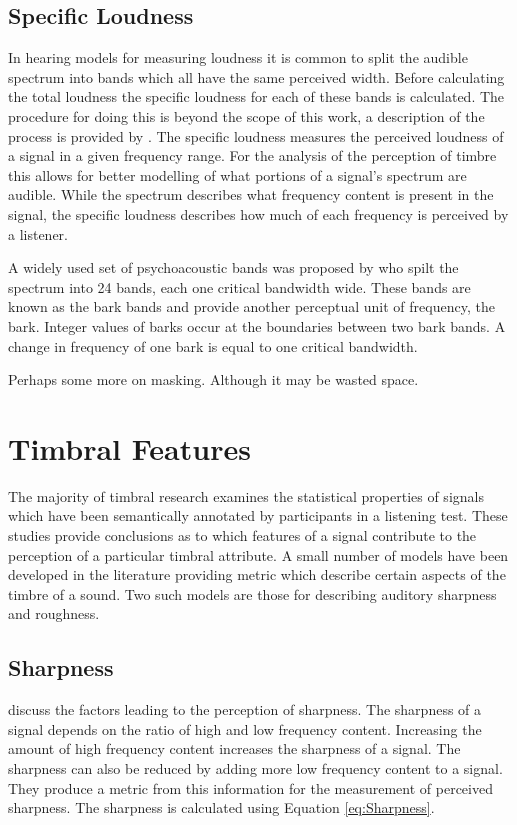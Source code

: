	\subsection{Specific Loudness}
	\label{sec:Timbre-PsychoacousticPrinciples-SpecificLoudness}
		In hearing models for measuring loudness it is common to split the audible spectrum into bands which all
		have the same perceived width. Before calculating the total loudness the specific loudness for each of
		these bands is calculated. The procedure for doing this is beyond the scope of this work, a description of
		the process is provided by \citet{moore1997a}. The specific loudness measures the perceived loudness of a
		signal in a given frequency range. For the analysis of the perception of timbre this allows for better
		modelling of what portions of a signal's spectrum are audible. While the spectrum describes what frequency
		content is present in the signal, the specific loudness describes how much of each frequency is perceived
		by a listener.

		A widely used set of psychoacoustic bands was proposed by \citet{zwicker1961subdivision} who spilt the
		spectrum into 24 bands, each one critical bandwidth wide. These bands are known as the bark bands and
		provide another perceptual unit of frequency, the bark. Integer values of barks occur at the boundaries
		between two bark bands. A change in frequency of one bark is equal to one critical bandwidth.

	\note
	{
		Perhaps some more on masking. Although it may be wasted space.
	}

\section{Timbral Features}
\label{sec:Timbre-TimbralFeatures}
	The majority of timbral research examines the statistical properties of signals which have been semantically
	annotated by participants in a listening test. These studies provide conclusions as to which features of a signal
	contribute to the perception of a particular timbral attribute. A small number of models have been developed in the
	literature providing metric which describe certain aspects of the timbre of a sound. Two such models are those for
	describing auditory sharpness and roughness.
	
	\subsection{Sharpness}
	\label{sec:Timbre-TimbralFeatures-Sharpness}
		\citet{fastl2007psychoacoustics} discuss the factors leading to the perception of sharpness. The sharpness
		of a signal depends on the ratio of high and low frequency content. Increasing the amount of high frequency
		content increases the sharpness of a signal. The sharpness can also be reduced by adding more low frequency
		content to a signal. They produce a metric from this information for the measurement of perceived
		sharpness.  The sharpness is calculated using Equation \ref{eq:Sharpness}.

